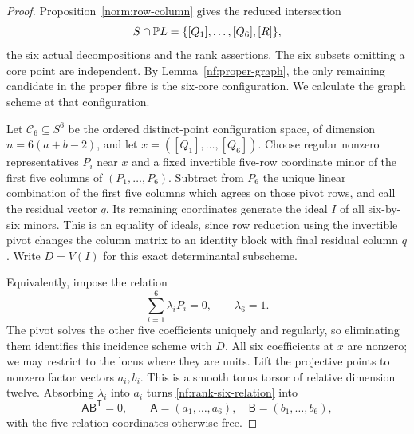 \begin{proof}
Proposition~\ref{norm:row-column} gives the reduced intersection
\[
 S\cap\mathbb P L=\{[Q_1],\ldots,[Q_6],[R]\},
\]
the six actual decompositions and the rank assertions. The six
subsets omitting a core point are independent. By
Lemma~\ref{nf:proper-graph}, the only remaining candidate in the
proper fibre is the six-core configuration. We calculate the graph
scheme at that configuration.

Let $\mathcal C_6\subseteq S^6$ be the ordered distinct-point
configuration space, of dimension $n=6(a+b-2)$, and let
$x=([Q_1],\ldots,[Q_6])$. Choose regular nonzero representatives
$P_i$ near $x$ and a fixed invertible five-row coordinate minor of
the first five columns of $(P_1,\ldots,P_6)$. Subtract from $P_6$
the unique linear combination of the first five columns which agrees
on those pivot rows, and call the residual vector $q$. Its remaining
coordinates generate the ideal $I$ of all six-by-six minors. This is
an equality of ideals, since row reduction using the invertible
pivot changes the column matrix to an identity block with final
residual column $q$. Write $D=V(I)$ for this exact determinantal
subscheme.

Equivalently, impose the relation
\begin{equation}\label{nf:rank-six-relation}
 \sum_{i=1}^6\lambda_iP_i=0,\qquad \lambda_6=1.
\end{equation}
The pivot solves the other five coefficients uniquely and regularly,
so eliminating them identifies this incidence scheme with $D$.
All six coefficients at $x$ are nonzero; we may restrict to the
locus where they are units. Lift the projective points to nonzero
factor vectors $a_i,b_i$. This is a smooth torus torsor of relative
dimension twelve. Absorbing $\lambda_i$ into $a_i$ turns
\eqref{nf:rank-six-relation} into
\begin{equation}\label{nf:rank-six-product}
 \mathsf A\mathsf B^{\mathsf T}=0,
 \qquad
 \mathsf A=(a_1,\ldots,a_6),\quad
 \mathsf B=(b_1,\ldots,b_6),
\end{equation}
with the five relation coordinates otherwise free.


\end{proof}
